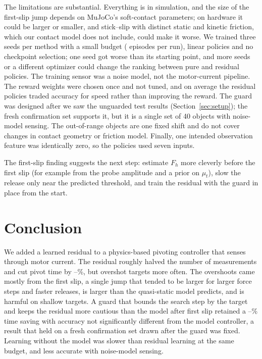 \documentclass[11pt]{article}
\begin{document}
The limitations are substantial. Everything is in simulation, and the size of the first-slip jump depends on MuJoCo's soft-contact parameters; on hardware it could be larger or smaller, and stick--slip with distinct static and kinetic friction, which our contact model does not include, could make it worse. We trained three seeds per method with a small budget (\EpPerRun{} episodes per run), linear policies and no checkpoint selection; one seed got worse than its starting point, and more seeds or a different optimizer could change the ranking between pure and residual policies. The training sensor was a noise model, not the motor-current pipeline. The reward weights were chosen once and not tuned, and on average the residual policies traded accuracy for speed rather than improving the reward. The guard was designed after we saw the unguarded test results (Section~\ref{sec:setup}); the fresh confirmation set supports it, but it is a single set of 40 objects with noise-model sensing. The out-of-range objects are one fixed shift and do not cover changes in contact geometry or friction model. Finally, one intended observation feature was identically zero, so the policies used seven inputs.

The first-slip finding suggests the next step: estimate $F_h$ more cleverly before the first slip (for example from the probe amplitude and a prior on $\mu_t$), slow the release only near the predicted threshold, and train the residual with the guard in place from the start.

\section{Conclusion}
We added a learned residual to a physics-based pivoting controller that senses through motor current. The residual roughly halved the number of measurements and cut pivot time by \IResTimeCut--\CResTimeCut\%, but overshot targets more often. The overshoots came mostly from the first slip, a single jump that tended to be larger for larger force steps and faster releases, is larger than the quasi-static model predicts, and is harmful on shallow targets. A guard that bounds the search step by the target and keeps the residual more cautious than the model after first slip retained a \IResGTimeCut--\CResGTimeCut\% time saving with accuracy not significantly different from the model controller, a result that held on a fresh confirmation set drawn after the guard was fixed. Learning without the model was slower than residual learning at the same budget, and less accurate with noise-model sensing.
\end{document}
